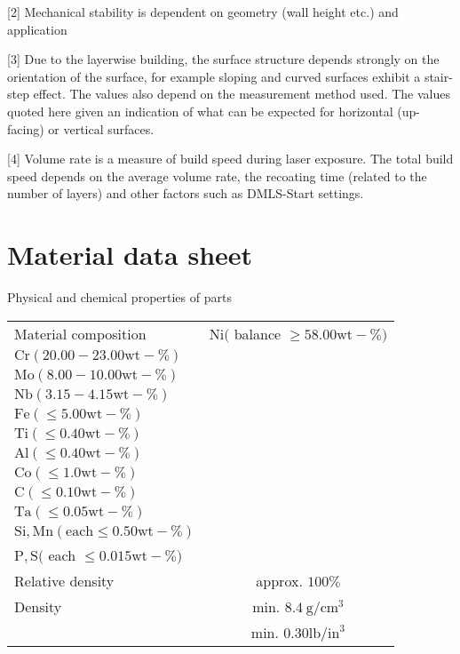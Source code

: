\documentclass[10pt]{article}
\begin{document}
[2] Mechanical stability is dependent on geometry (wall height etc.) and application

[3] Due to the layerwise building, the surface structure depends strongly on the orientation of the surface, for example sloping and curved surfaces exhibit a stair-step effect. The values also depend on the measurement method used. The values quoted here given an indication of what can be expected for horizontal (up-facing) or vertical surfaces.

[4] Volume rate is a measure of build speed during laser exposure. The total build speed depends on the average volume rate, the recoating time (related to the number of layers) and other factors such as DMLS-Start settings.

\section*{Material data sheet}
Physical and chemical properties of parts

\begin{center}
\begin{tabular}{lc}
\hline
Material composition & $\mathrm{Ni}($ balance $\geq 58.00 \mathrm{wt}-\%)$ \\
$\mathrm{Cr}(20.00-23.00 \mathrm{wt}-\%)$ &  \\
$\mathrm{Mo}(8.00-10.00 \mathrm{wt}-\%)$ &  \\
$\mathrm{Nb}(3.15-4.15 \mathrm{wt}-\%)$ &  \\
$\mathrm{Fe}(\leq 5.00 \mathrm{wt}-\%)$ &  \\
$\mathrm{Ti}(\leq 0.40 \mathrm{wt}-\%)$ &  \\
$\mathrm{Al}(\leq 0.40 \mathrm{wt}-\%)$ &  \\
$\mathrm{Co}(\leq 1.0 \mathrm{wt}-\%)$ &  \\
$\mathrm{C}(\leq 0.10 \mathrm{wt}-\%)$ &  \\
$\mathrm{Ta}(\leq 0.05 \mathrm{wt}-\%)$ &  \\
$\mathrm{Si}, \mathrm{Mn}(\mathrm{each} \leq 0.50 \mathrm{wt}-\%)$ &  \\
$\mathrm{P}, \mathrm{S}($ each $\leq 0.015 \mathrm{wt}-\%)$ &  \\
\hline
Relative density & approx. $100 \%$ \\
\hline
Density & min. $8.4 \mathrm{~g} / \mathrm{cm}^{3}$ \\
 & min. $0.30 \mathrm{lb} / \mathrm{in}^{3}$ \\
\hline
\end{tabular}
\end{center}
\end{document}
